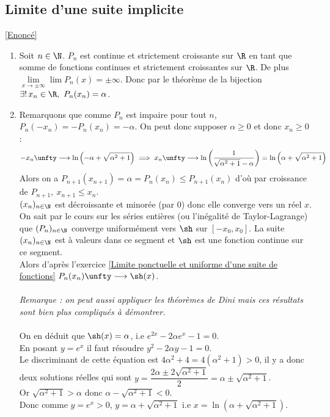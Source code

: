\documentclass{book}
\begin{document}
	\subsection{Limite d'une suite implicite }
	\label{Limite d'une suite implicite Corrigé}
	\textcolor{blue}{\hyperref[Limite d'une suite implicite]{[Enoncé]}}\\
	\begin{enumerate}[leftmargin=*]
		\item Soit $n\in \N$. $P_n$ est continue et strictement croissante sur $\R$ en tant que somme de fonctions continues et strictement croissantes sur $\R$. De plus $\lim\limits_{x\to \pm\infty}\lim P_n(x)=\pm\infty$. Donc par le théorème de la bijection $\exists!\, x_n\in \R,\ P_n(x_n)=\alpha$.
		\item Remarquons que comme $P_n$ est impaire pour tout $n$, $P_n(-x_n)=-P_n(x_n)=-\alpha$. On peut donc supposer $\alpha\geq 0$ et donc $x_n\geq 0$ :
		$$-x_n\unfty\longrightarrow \ln\left(-\alpha+\sqrt{\alpha^2+1}\right)\implies x_n\unfty\longrightarrow\ln\left(\frac{1}{\sqrt{\alpha^2+1}-\alpha}\right)=\ln\left(\alpha+\sqrt{\alpha^2+1}\right)$$
		Alors on a $P_{n+1}(x_{n+1})=\alpha=P_n(x_n)\leq P_{n+1}(x_n)$ d'où par croissance de $P_{n+1},\ x_{n+1}\leq x_n$.\\
		$(x_n)_{n\in \N}$ est décroissante et minorée (par $0$) donc elle converge vers un réel $x$.\\
		On sait par le cours sur les séries entières (ou l'inégalité de Taylor-Lagrange) que $(P_n)_{n\in \N}$ converge uniformément vers $\sh$ sur $[-x_0,x_0]$. La suite $(x_n)_{n\in \N}$ est à valeurs dans ce segment et $\sh$ est une fonction continue sur ce segment.\\
		Alors d'après l'exercice \ref{Limite ponctuelle et uniforme d'une suite de fonctions} $P_n(x_n)\unfty\longrightarrow \sh(x)$.\\\\
		\textit{Remarque : on peut aussi appliquer les théorèmes de Dini mais ces résultats sont bien plus compliqués à démontrer.}\\\\
		On en déduit que $\sh(x)=\alpha$, i.e $e^{2x}-2\alpha e^x-1=0$.\\
		En posant $y=e^x$ il faut résoudre $y^2-2\alpha y-1=0$.\\
		Le discriminant de cette équation est $4\alpha^2+4=4(\alpha^2+1)>0$, il y a donc deux solutions réelles qui sont $y=\dfrac{2\alpha\pm2\sqrt{\alpha^2+1}}{2}=\alpha\pm\sqrt{\alpha^2+1}$.\\
		Or $\sqrt{\alpha^2+1}>\alpha$ donc $\alpha-\sqrt{\alpha^2+1}<0$.\\
		Donc comme $y=e^x>0$, $y=\alpha+\sqrt{\alpha^2+1}$ i.e $x=\ln\left(\alpha+\sqrt{\alpha^2+1}\right)$.
	\end{enumerate}
	
\end{document}
